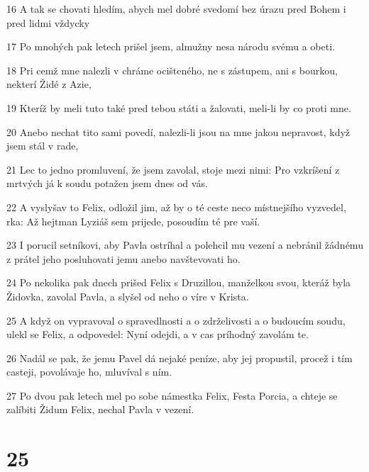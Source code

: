 \par 16 A tak se chovati hledím, abych mel dobré svedomí bez úrazu pred Bohem i pred lidmi vždycky
\par 17 Po mnohých pak letech prišel jsem, almužny nesa národu svému a obeti.
\par 18 Pri cemž mne nalezli v chráme ocišteného, ne s zástupem, ani s bourkou, nekterí Židé z Azie,
\par 19 Kteríž by meli tuto také pred tebou státi a žalovati, meli-li by co proti mne.
\par 20 Anebo nechat tito sami povedí, nalezli-li jsou na mne jakou nepravost, když jsem stál v rade,
\par 21 Lec to jedno promluvení, že jsem zavolal, stoje mezi nimi: Pro vzkríšení z mrtvých já k soudu potažen jsem dnes od vás.
\par 22 A vyslyšav to Felix, odložil jim, až by o té ceste neco místnejšího vyzvedel, rka: Až hejtman Lyziáš sem prijede, posoudím té pre vaší.
\par 23 I porucil setníkovi, aby Pavla ostríhal a polehcil mu vezení a nebránil žádnému z prátel jeho posluhovati jemu anebo navštevovati ho.
\par 24 Po nekolika pak dnech prišed Felix s Druzillou, manželkou svou, kteráž byla Židovka, zavolal Pavla, a slyšel od neho o víre v Krista.
\par 25 A když on vypravoval o spravedlnosti a o zdrželivosti a o budoucím soudu, ulekl se Felix, a odpovedel: Nyní odejdi, a v cas príhodný zavolám te.
\par 26 Nadál se pak, že jemu Pavel dá nejaké peníze, aby jej propustil, procež i tím casteji, povolávaje ho, mluvíval s ním.
\par 27 Po dvou pak letech mel po sobe námestka Felix, Festa Porcia, a chteje se zalíbiti Židum Felix, nechal Pavla v vezení.

\chapter{25}

